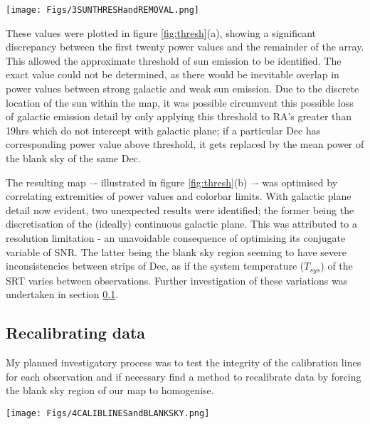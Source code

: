 \documentclass[11pt]{article} %
\begin{document}
%

\begin{figure*}[t!]
\centering
\texttt{[image: Figs/3SUNTHRESHandREMOVAL.png]}
\caption{Sun Saturation Correction. a) High Powers plotted to identify Sun threshold. b) Sky map after blank sky calibration. }
\label{fig:thresh}
\end{figure*}
%

These values were plotted in figure \ref{fig:thresh}(a), showing a significant discrepancy between the first twenty power values and the remainder of the array. This allowed the approximate threshold of sun emission to be identified. The exact value could not be determined, as there would be inevitable overlap in power values between strong galactic and weak sun emission. Due to the discrete location of the sun within the map, it was possible circumvent this possible loss of galactic emission detail by only applying this threshold to RA’s greater than 19hrs which do not intercept with galactic plane; if a particular Dec has corresponding power value above threshold, it gets replaced by the mean power of the blank sky of the same Dec.

The resulting map –- illustrated in figure \ref{fig:thresh}(b) –- was optimised by correlating extremities of power values and colorbar limits. With galactic plane detail now evident, two unexpected results were identified; the former being the discretisation of the (ideally) continuous galactic plane. This was attributed to a resolution limitation - an unavoidable consequence of optimising its conjugate variable of SNR. The latter being the blank sky region seeming to have severe inconsistencies between strips of Dec, as if the system temperature ($T_{sys}$) of the SRT varies between observations. Further investigation of these variations was undertaken in section \ref{recalib}.
 
 \subsection{Recalibrating data} \label{recalib}

My planned investigatory process was to test the integrity of the calibration lines for each observation and if necessary find a method to recalibrate data by forcing the blank sky region of our map to homogenise.


\begin{figure*}[t!]
\centering
\texttt{[image: Figs/4CALIBLINESandBLANKSKY.png]}
\caption{Blank sky calibration. a) Plot of mean transmission of calibration lines for each observation. b) Resulting sky map from recalibration.}
\label{fig:recalib}
\end{figure*}
\end{document}
